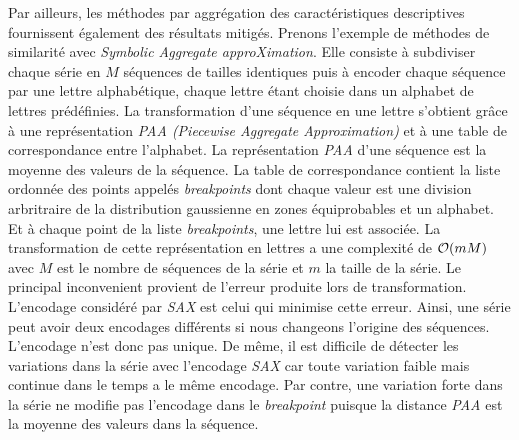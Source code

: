 Par ailleurs, les m\'ethodes par aggr\'egation des caract\'eristiques descriptives fournissent \'egalement des r\'esultats mitig\'es. Prenons l'exemple de m\'ethodes de similarit\'e avec {\em Symbolic Aggregate approXimation}. Elle consiste \`a subdiviser chaque s\'erie en $M$ s\'equences de tailles identiques puis \`a encoder chaque s\'equence par une lettre alphab\'etique, chaque lettre \'etant choisie dans un alphabet de lettres pr\'ed\'efinies. La transformation d'une s\'equence en une lettre s'obtient gr\^ace \`a une repr\'esentation {\em PAA (Piecewise Aggregate Approximation)} et \`a une table de correspondance entre l'alphabet. 
La repr\'esentation {\em PAA} \cite{paatheorique} d'une s\'equence est la moyenne des valeurs de la s\'equence. La table de correspondance contient la liste ordonn\'ee des points appel\'es {\em breakpoints} dont chaque valeur est une division arbritraire de la distribution gaussienne en zones \'equiprobables \cite{lin2003symbolic} et un alphabet. Et \`a chaque point de la liste {\em breakpoints}, une lettre lui est associ\'ee.
La transformation de cette repr\'esentation en lettres a une complexit\'e de  ${\cal O}(mM)$ \cite{lin2003symbolic} avec $M$ est le nombre de s\'equences de la s\'erie
et $m$ la taille de la s\'erie.
Le principal inconvenient provient de  l'erreur produite lors de transformation. L'encodage consid\'er\'e par {\em SAX} est celui qui minimise cette erreur.
 Ainsi, une s\'erie peut avoir deux encodages diff\'erents si nous changeons l'origine des s\'equences. L'encodage n'est donc pas unique.
De m\^eme, il est difficile de d\'etecter les variations dans la s\'erie avec l'encodage {\em SAX} car  toute variation faible mais continue dans le temps a le m\^eme encodage.  Par contre, une variation forte dans la s\'erie ne modifie pas l'encodage dans le {\em breakpoint} puisque la distance {\em PAA} est la moyenne des valeurs dans la s\'equence. 
\newline

